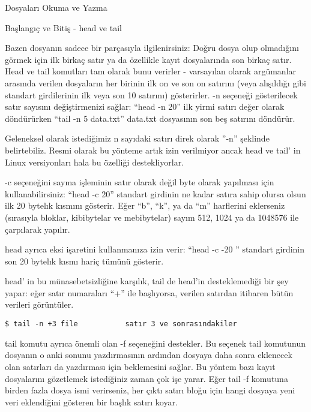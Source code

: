 \begin{section}{Dosyaları Okuma ve Yazma}
\begin{subsection}{Başlangıç ve Bitiş - head ve tail}

Bazen dosyanın sadece bir parçasıyla ilgilenirsiniz: Doğru dosya olup olmadığını görmek için ilk birkaç satır ya da özellikle kayıt dosyalarında son birkaç satır. Head ve tail komutları tam olarak bunu verirler - varsayılan olarak argümanlar arasında verilen dosyaların her birinin ilk on ve son on satırını (veya alışıldığı gibi standart girdilerinin ilk veya son 10 satırını) gös\-te\-rir\-ler. -n seçeneği gösterilecek satır sayısını değiştirmenizi sağlar: “head -n 20” ilk yirmi satırı değer olarak döndürürken “tail -n 5 data.txt” data.txt dosyasının son beş satırını döndürür.

Geleneksel olarak istediğimiz n sayıdaki satırı direk olarak ”-n” şeklinde belirtebiliz. Resmi olarak bu yönteme artık izin verilmiyor ancak head ve tail' in Linux versiyonları hala bu özelliği destekliyorlar.

-c seçeneğini sayma işleminin satır olarak değil byte olarak yapılması için kullanabilirsiniz: “head -c 20” standart girdinin ne kadar satıra sahip olursa olsun ilk 20 bytelık kısmını gösterir. Eğer “b”, “k”, ya da “m” harflerini eklerseniz (sırasıyla bloklar, kibibytelar ve mebibytelar) sayım 512, 1024 ya da 1048576 ile çarpılarak yapılır.

head ayrıca eksi işaretini kullanmanıza izin verir: “head -c -20 ” standart girdinin son 20 bytelık kısmı hariç tümünü gösterir.

head' in bu münasebetsizliğine karşılık, tail de head'in desteklemediği bir şey yapar: eğer satır numaraları “+” ile başlıyorsa, verilen satırdan itibaren bütün verileri görüntüler.
\begin{verbatim}
$ tail -n +3 file           satır 3 ve sonrasındakiler
\end{verbatim}

tail komutu ayrıca önemli olan -f seçeneğini destekler. Bu seçenek tail komutunun dosyanın o anki sonunu yazdırmasının ardından dosyaya daha sonra eklenecek olan satırları da yazdırması için beklemesini sağlar. Bu yöntem bazı kayıt dosyalarını gözetlemek istediğiniz zaman çok işe yarar. Eğer tail -f komutuna birden fazla dosya ismi verirseniz, her çıktı satırı bloğu için hangi dosyaya yeni veri eklendiğini gösteren bir başlık satırı koyar.


\end{subsection}
\end{section}
